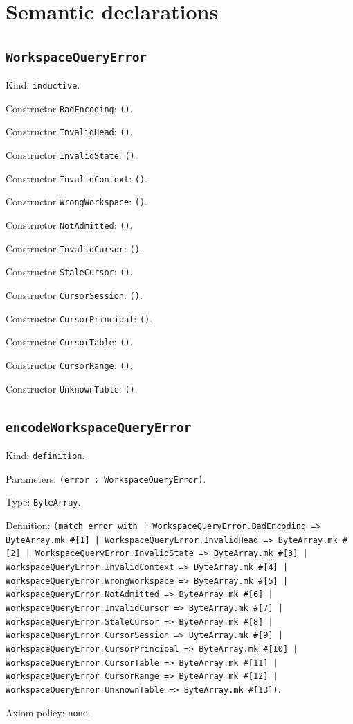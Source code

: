 \documentclass[11pt]{article}
\begin{document}
\section*{Semantic declarations}
\subsection*{\texttt{WorkspaceQueryError}}
\noindent Kind: \texttt{inductive}.\par
\noindent Constructor \texttt{BadEncoding}: \texttt{()}.\par
\noindent Constructor \texttt{InvalidHead}: \texttt{()}.\par
\noindent Constructor \texttt{InvalidState}: \texttt{()}.\par
\noindent Constructor \texttt{InvalidContext}: \texttt{()}.\par
\noindent Constructor \texttt{WrongWorkspace}: \texttt{()}.\par
\noindent Constructor \texttt{NotAdmitted}: \texttt{()}.\par
\noindent Constructor \texttt{InvalidCursor}: \texttt{()}.\par
\noindent Constructor \texttt{StaleCursor}: \texttt{()}.\par
\noindent Constructor \texttt{CursorSession}: \texttt{()}.\par
\noindent Constructor \texttt{CursorPrincipal}: \texttt{()}.\par
\noindent Constructor \texttt{CursorTable}: \texttt{()}.\par
\noindent Constructor \texttt{CursorRange}: \texttt{()}.\par
\noindent Constructor \texttt{UnknownTable}: \texttt{()}.\par
\subsection*{\texttt{encodeWorkspaceQueryError}}
\noindent Kind: \texttt{definition}.\par
\noindent Parameters: \texttt{(error : WorkspaceQueryError)}.\par
\noindent Type: \texttt{ByteArray}.\par
\noindent Definition: \texttt{(match error with | WorkspaceQueryError.BadEncoding => ByteArray.mk \#[1] | WorkspaceQueryError.InvalidHead => ByteArray.mk \#[2] | WorkspaceQueryError.InvalidState => ByteArray.mk \#[3] | WorkspaceQueryError.InvalidContext => ByteArray.mk \#[4] | WorkspaceQueryError.WrongWorkspace => ByteArray.mk \#[5] | WorkspaceQueryError.NotAdmitted => ByteArray.mk \#[6] | WorkspaceQueryError.InvalidCursor => ByteArray.mk \#[7] | WorkspaceQueryError.StaleCursor => ByteArray.mk \#[8] | WorkspaceQueryError.CursorSession => ByteArray.mk \#[9] | WorkspaceQueryError.CursorPrincipal => ByteArray.mk \#[10] | WorkspaceQueryError.CursorTable => ByteArray.mk \#[11] | WorkspaceQueryError.CursorRange => ByteArray.mk \#[12] | WorkspaceQueryError.UnknownTable => ByteArray.mk \#[13])}.\par
\noindent Axiom policy: \texttt{none}.\par
\end{document}
